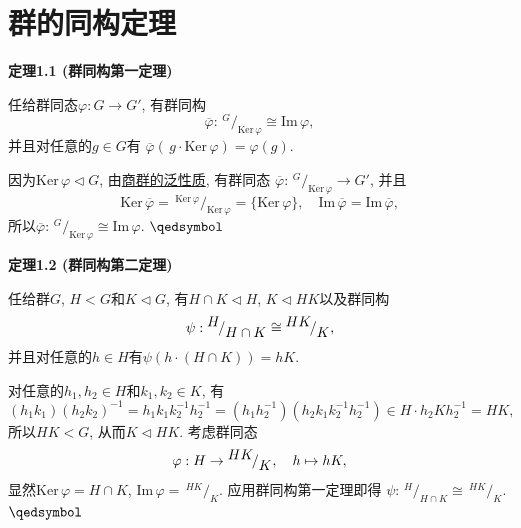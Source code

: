 \documentclass[UTF8]{ctexart}
\begin{document}
\setlength{\abovedisplayskip}{1pt}
\setlength{\belowdisplayskip}{1pt}

\section{群的同构定理}

\hypertarget{sec:定理1.1}{}
\noindent\textbf{定理1.1 (群同构第一定理)}

任给群同态$\varphi:G\to G'$, 有群同构
\[
    \overline{\varphi}:\,\!^{\displaystyle G}\!
    /_{\displaystyle\mathrm{Ker}\,\varphi}\cong\mathrm{Im}\,\varphi,
\]
并且对任意的$g\in G$有
$\overline{\varphi}(\,g\cdot\mathrm{Ker}\,\varphi)=\varphi(g)$.


因为$\mathrm{Ker}\,\varphi\lhd G$,
由\href{04 正规子群与商群#nameddest=sec:定理2.1}{商群的泛性质}, 有群同态
$\overline{\varphi}:\,\!^{\displaystyle G}\!
/_{\displaystyle\mathrm{Ker}\,\varphi}\to G'$, 并且
\vspace{3pt}
\[
    \mathrm{Ker}\,\overline{\varphi}=\,\!^{\displaystyle\mathrm{Ker}\,\varphi}\!
    /_{\displaystyle\mathrm{Ker}\,\varphi}=\{\mathrm{Ker}\,\varphi\},\quad
    \mathrm{Im}\,\overline{\varphi}=\mathrm{Im}\,\overline{\varphi},
\]
所以$\overline{\varphi}:\,\!^{\displaystyle G}\!
/_{\displaystyle\mathrm{Ker}\,\varphi}\cong\mathrm{Im}\,\varphi$.
\hfill $\qedsymbol$

\vspace{15pt}

\hypertarget{sec:定理1.2}{}
\noindent\textbf{定理1.2 (群同构第二定理)}

任给群$G$, $H<G$和$K\lhd G$, 有$H\cap K\lhd H$, $K\lhd HK$以及群同构
\vspace{3pt}
\[
    \psi:\,\!^{\displaystyle H}\!/_{\displaystyle H\cap K}
    \cong\,\!^{\displaystyle HK}\!/_{\displaystyle K},\\[3pt]
\]
并且对任意的$h\in H$有$\psi(h\cdot(H\cap K))=hK$.


对任意的$h_1,h_2\in H$和$k_1,k_2\in K$, 有
\[
    (h_1k_1)(h_2k_2)^{-1}=h_1k_1k_2^{-1}h_2^{-1}=
    (h_1h_2^{-1})(h_2k_1k_2^{-1}h_2^{-1})\in H\cdot h_2Kh_2^{-1}=HK,
\]
所以$HK<G$, 从而$K\lhd HK$. 考虑群同态
\[
    \varphi:H\to\,\!^{\displaystyle HK}\!/_{\displaystyle K},
    \quad h\mapsto hK,\\[3pt]
\]
显然$\mathrm{Ker}\,\varphi=H\cap K$, $\mathrm{Im}\,\varphi=
\,\!^{\displaystyle HK}\!/_{\displaystyle K}$. 应用群同构第一定理即得
$\psi:\,\!^{\displaystyle H}\!/_{\displaystyle H\cap K}
\cong\,\!^{\displaystyle HK}\!/_{\displaystyle K}$. \hfill $\qedsymbol$
\end{document}
